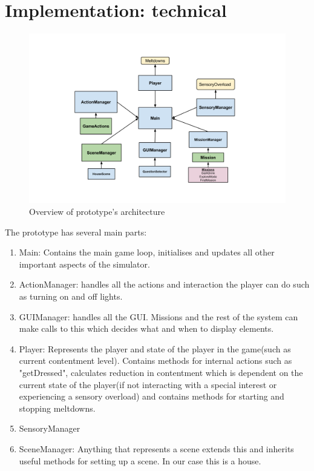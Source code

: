 \documentclass[11pt]{report}
\begin{document}
\section{Implementation: technical}

\begin{figure}[H]
\centering
\includegraphics[scale=0.6]{images/prototype/prototypeoverview.png}
\caption{Overview of prototype's architecture}
\label{protooverview}
\end{figure}

The prototype has several main parts:
\begin{enumerate}
\item Main: Contains the main game loop, initialises and updates all other important aspects of the simulator.
\item ActionManager: handles all the actions and interaction the player can do such as turning on and off lights.
\item GUIManager: handles all the GUI. Missions and the rest of the system can make calls to this which decides what and when to display elements. 
\item Player: Represents the player and state of the player in the game(such as current contentment level). Contains methods for internal actions such as "getDressed", calculates reduction in contentment which is dependent on the current state of the player(if not interacting with a special interest or experiencing a sensory overload) and contains methods for starting and stopping meltdowns.
\item SensoryManager
\item SceneManager: Anything that represents a scene extends this and inherits useful methods for setting up a scene. In our case this is a house. 
\end{enumerate}
\end{document}
